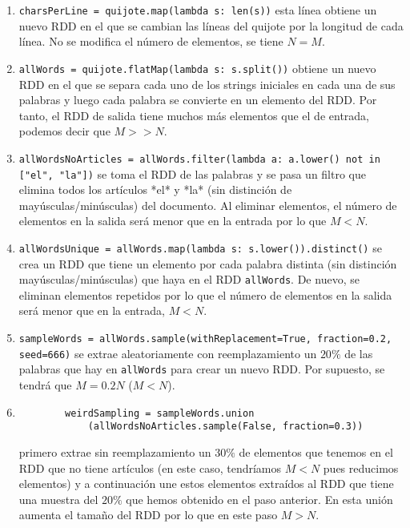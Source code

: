 \documentclass[11pt]{article}
\def\inline{\lstinline[basicstyle=\ttfamily,keywordstyle={}]}
\begin{document}
\begin{enumerate}
	\item \inline{charsPerLine = quijote.map(lambda s: len(s))} esta línea obtiene un nuevo RDD en el que se cambian las líneas del quijote por la longitud de cada línea. No se modifica el número de elementos, se tiene $N = M$.
	
	\item \inline{allWords = quijote.flatMap(lambda s: s.split())} obtiene un nuevo RDD en el que se separa cada uno de los strings iniciales en cada una de sus palabras y luego cada palabra se convierte en un elemento del RDD. Por tanto, el RDD de salida tiene muchos más elementos que el de entrada, podemos decir que $M >> N$.
	
	\item \inline{allWordsNoArticles = allWords.filter(lambda a: a.lower() not in ["el", "la"])} se toma el RDD de las palabras y se pasa un filtro que elimina todos los artículos *el* y *la* (sin distinción de mayúsculas/minúsculas) del documento. Al eliminar elementos, el número de elementos en la salida será menor que en la entrada por lo que $M < N$.
	
	\item \inline{allWordsUnique = allWords.map(lambda s: s.lower()).distinct()} se crea un RDD que tiene un elemento por cada palabra distinta (sin distinción mayúsculas/minúsculas) que haya en el RDD \inline{allWords}. De nuevo, se eliminan elementos repetidos por lo que el número de elementos en la salida será menor que en la entrada, $M < N$.
	
	\item \inline{sampleWords = allWords.sample(withReplacement=True, fraction=0.2, seed=666)} se extrae aleatoriamente con reemplazamiento un $20\%$ de las palabras que hay en \inline{allWords} para crear un nuevo RDD. Por supuesto, se tendrá que $M = 0.2 N$ ($M < N$).
	
	\item \begin{verbatim}
	    weirdSampling = sampleWords.union
	        (allWordsNoArticles.sample(False, fraction=0.3))
		\end{verbatim} 
		primero extrae sin reemplazamiento un $30\%$ de elementos que tenemos en el RDD que no tiene artículos (en este caso, tendríamos $M < N$ pues reducimos elementos) y a continuación une estos elementos extraídos al RDD que tiene una muestra del $20\%$ que hemos obtenido en el paso anterior. En esta unión aumenta el tamaño del RDD por lo que en este paso $M > N$.
\end{enumerate}
\end{document}
